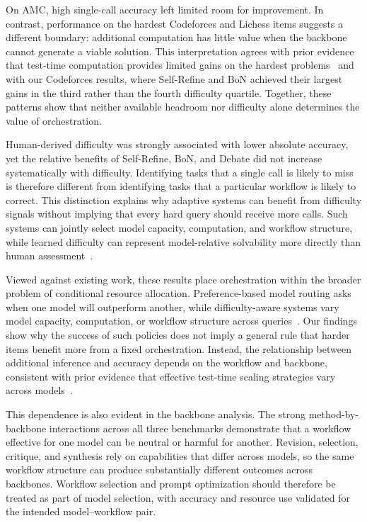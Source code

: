 \documentclass[a4paper]{article}
\theoremstyle{plain}
\theoremstyle{definition}
\theoremstyle{remark}
\begin{document}
On AMC, high single-call accuracy left limited room for improvement. In contrast, performance on the hardest Codeforces and Lichess items suggests a different boundary: additional computation has little value when the backbone cannot generate a viable solution.
This interpretation agrees with prior evidence that test-time computation provides limited gains on the hardest problems~\citep{snell_scaling_2025} and with our Codeforces results, where Self-Refine and BoN achieved their largest gains in the third rather than the fourth difficulty quartile.
Together, these patterns show that neither available headroom nor difficulty alone determines the value of orchestration.

Human-derived difficulty was strongly associated with lower absolute accuracy, yet the relative benefits of Self-Refine, BoN, and Debate did not increase systematically with difficulty.
Identifying tasks that a single call is likely to miss is therefore different from identifying tasks that a particular workflow is likely to correct.
This distinction explains why adaptive systems can benefit from difficulty signals without implying that every hard query should receive more calls.
Such systems can jointly select model capacity, computation, and workflow structure, while learned difficulty can represent model-relative solvability more directly than human assessment~\citep{bae_complexitynet_2023,cheng_adaptivellm_2025,snell_scaling_2025,su_difficulty-aware_2026,zhang_multi-agent_2025}.

Viewed against existing work, these results place orchestration within the broader problem of conditional resource allocation.
Preference-based model routing asks when one model will outperform another, while difficulty-aware systems vary model capacity, computation, or workflow structure across queries~\citep{ong_routellm_2025}.
Our findings show why the success of such policies does not imply a general rule that harder items benefit more from a fixed orchestration.
Instead, the relationship between additional inference and accuracy depends on the workflow and backbone, consistent with prior evidence that effective test-time scaling strategies vary across models~\citep{snell_scaling_2025,smit_should_2024}.

This dependence is also evident in the backbone analysis.
The strong method-by-backbone interactions across all three benchmarks demonstrate that a workflow effective for one model can be neutral or harmful for another.
Revision, selection, critique, and synthesis rely on capabilities that differ across models, so the same workflow structure can produce substantially different outcomes across backbones.
Workflow selection and prompt optimization should therefore be treated as part of model selection, with accuracy and resource use validated for the intended model--workflow pair.
\end{document}
